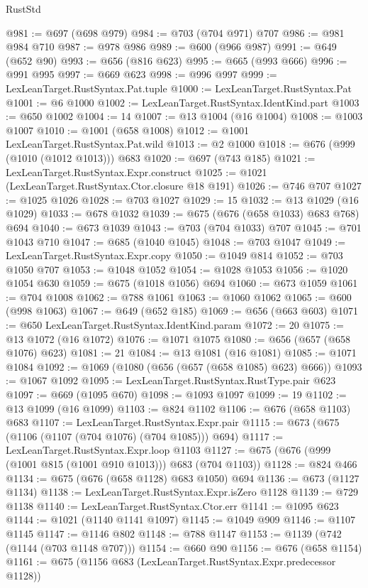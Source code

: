 \begin{lexlean}{RustStd}
\begin{coremodule}
{\begin{coremodule}
{{{{{{{{{{{{@981 := @697 (@698 @979)
@984 := @703 (@704 @971) @707
@986 := @981 @984 @710
@987 := @978 @986
@989 := @600 (@966 @987)
@991 := @649 (@652 @90)
@993 := @656 (@816 @623)
@995 := @665 (@993 @666)
@996 := @991 @995
@997 := @669 @623
@998 := @996 @997
@999 := LexLeanTarget.RustSyntax.Pat.tuple
@1000 := LexLeanTarget.RustSyntax.Pat
@1001 := @6 @1000
@1002 := LexLeanTarget.RustSyntax.IdentKind.part
@1003 := @650 @1002
@1004 := 14
@1007 := @13 @1004 (@16 @1004)
@1008 := @1003 @1007
@1010 := @1001 (@658 @1008)
@1012 := @1001 LexLeanTarget.RustSyntax.Pat.wild
@1013 := @2 @1000
@1018 := @676 (@999 (@1010 (@1012 @1013))) @683
@1020 := @697 (@743 @185)
@1021 := LexLeanTarget.RustSyntax.Expr.construct
@1025 := @1021 (LexLeanTarget.RustSyntax.Ctor.closure @18 @191)
@1026 := @746 @707
@1027 := @1025 @1026
@1028 := @703 @1027
@1029 := 15
@1032 := @13 @1029 (@16 @1029)
@1033 := @678 @1032
@1039 := @675 (@676 (@658 @1033) @683 @768) @694
@1040 := @673 @1039
@1043 := @703 (@704 @1033) @707
@1045 := @701 @1043 @710
@1047 := @685 (@1040 @1045)
@1048 := @703 @1047
@1049 := LexLeanTarget.RustSyntax.Expr.copy
@1050 := @1049 @814
@1052 := @703 @1050 @707
@1053 := @1048 @1052
@1054 := @1028 @1053
@1056 := @1020 @1054 @630
@1059 := @675 (@1018 @1056) @694
@1060 := @673 @1059
@1061 := @704 @1008
@1062 := @788 @1061
@1063 := @1060 @1062
@1065 := @600 (@998 @1063)
@1067 := @649 (@652 @185)
@1069 := @656 (@663 @603)
@1071 := @650 LexLeanTarget.RustSyntax.IdentKind.param
@1072 := 20
@1075 := @13 @1072 (@16 @1072)
@1076 := @1071 @1075
@1080 := @656 (@657 (@658 @1076) @623)
@1081 := 21
@1084 := @13 @1081 (@16 @1081)
@1085 := @1071 @1084
@1092 := @1069 (@1080 (@656 (@657 (@658 @1085) @623) @666))
@1093 := @1067 @1092
@1095 := LexLeanTarget.RustSyntax.RustType.pair @623
@1097 := @669 (@1095 @670)
@1098 := @1093 @1097
@1099 := 19
@1102 := @13 @1099 (@16 @1099)
@1103 := @824 @1102
@1106 := @676 (@658 @1103) @683
@1107 := LexLeanTarget.RustSyntax.Expr.pair
@1115 := @673 (@675 (@1106 (@1107 (@704 @1076) (@704 @1085))) @694)
@1117 := LexLeanTarget.RustSyntax.Expr.loop @1103
@1127 := @675 (@676 (@999 (@1001 @815 (@1001 @910 @1013))) @683 (@704 @1103))
@1128 := @824 @466
@1134 := @675 (@676 (@658 @1128) @683 @1050) @694
@1136 := @673 (@1127 @1134)
@1138 := LexLeanTarget.RustSyntax.Expr.isZero @1128
@1139 := @729 @1138
@1140 := LexLeanTarget.RustSyntax.Ctor.err
@1141 := @1095 @623
@1144 := @1021 (@1140 @1141 @1097)
@1145 := @1049 @909
@1146 := @1107 @1145
@1147 := @1146 @802
@1148 := @788 @1147
@1153 := @1139 (@742 (@1144 (@703 @1148 @707)))
@1154 := @660 @90
@1156 := @676 (@658 @1154)
@1161 := @675 (@1156 @683 (LexLeanTarget.RustSyntax.Expr.predecessor @1128))
}}}}}}}}}}}}
\end{coremodule}}
\end{coremodule}
\end{lexlean}
